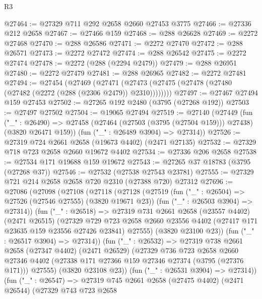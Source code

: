 \begin{lexlean}{R3}
\begin{coremodule}
@27464 := @27329 @711 @292 @2658 @2660 @27453 @3775
@27466 := @27336 @212 @2658
@27467 := @27466 @159
@27468 := @288 @26628
@27469 := @2272 @27468
@27470 := @288 @26586
@27471 := @2272 @27470
@27472 := @288 @26571
@27473 := @2272 @27472
@27474 := @288 @26542
@27475 := @2272 @27474
@27478 := @2272 (@288 (@2294 @2479))
@27479 := @288 @26951
@27480 := @2272 @27479
@27481 := @288 @26965
@27482 := @2272 @27481
@27494 := @27454
    (@27469
      (@27471 (@27473 (@27475 (@27478 (@27480 (@27482 (@2272 (@288 (@2306 @2479)) @2310))))))))
@27497 := @27467 @27494 @159 @27453
@27502 := @27265 @192 @2480 (@3795 (@27268 @192))
@27503 := @27497 @27502
@27504 := @19065 @27494
@27519 := @27140
    (@27449
      (fun ("_" : @26490) =>
      @27458 (@27464 (@27503 (@3795 (@27504 @159))) @27438) (@3820 @26471 @159))
      (fun ("_" : @26489 @3904) => @27314))
@27526 := @27319 @724 @2661 @2658 (@19673 @4402) (@2471 @27135)
@27532 := @27329 @718 @723 @2658 @2660 @19672 @4402
@27534 := @27336 @206 @2658
@27538 := @27534 @171 @19688 @159 @19672
@27543 := @27265 @37 @18783 (@3795 (@27268 @37))
@27546 := @27532 (@27538 @27543 @23781)
@27555 := @27329 @721 @214 @2658 @2658 @720 @2310 (@27388 @720) @27312
@27696 := @27086
    (@27098
      (@27108
        (@27118
          (@27128
            (@27519
              (fun ("_" : @26504) => @27526 (@27546 @27555) (@3820 @19671 @23))
              (fun ("_" : @26503 @3904) => @27314))
            (fun ("_" : @26518) =>
            @27319
              @731
              @2661
              @2658
              (@23557 @4402)
              (@2471 @26515)
              (@27329
                @729
                @723
                @2658
                @2660
                @23556
                @4402
                (@27417 @171 @23635 @159 @23556 @27426 @23841)
                @27555)
              (@3820 @23100 @23))
            (fun ("_" : @26517 @3904) => @27314))
          (fun ("_" : @26532) =>
          @27319
            @738
            @2661
            @2658
            (@27347 @4402)
            (@2471 @26529)
            (@27329
              @736
              @723
              @2658
              @2660
              @27346
              @4402
              (@27338 @171 @27366 @159 @27346 @27374 (@3795 (@27376 @171)))
              @27555)
            (@3820 @23108 @23))
          (fun ("_" : @26531 @3904) => @27314))
        (fun ("_" : @26547) =>
        @27319
          @745
          @2661
          @2658
          (@27475 @4402)
          (@2471 @26544)
          (@27329
            @743
            @723
            @2658

\end{coremodule}
\end{lexlean}

